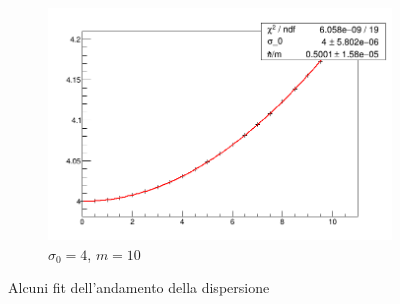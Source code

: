 \begin{figure}[ht]
\begin{subfigure}[b]{0.3\textwidth}
		\includegraphics[width=\linewidth]{IMG/dispersione_m2s4}
		\caption{$\sigma_0=4$, $m=10$}
	\end{subfigure}
	\caption{Alcuni fit dell'andamento della dispersione}\label{fig:dispersioneFitSigma4}
\end{figure}

